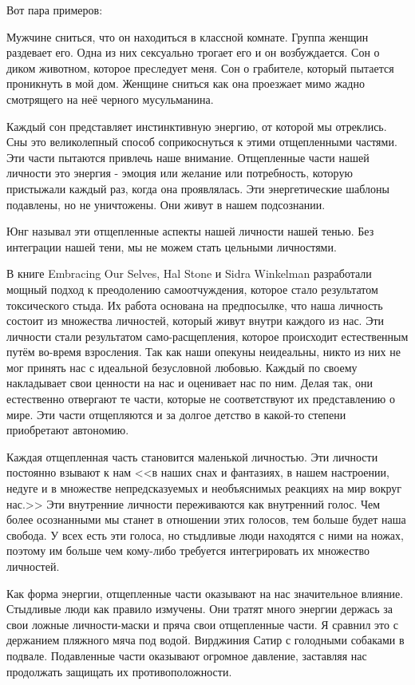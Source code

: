 \documentclass[10pt, fleqn]{article}
\begin{document}
Вот пара примеров:

Мужчине сниться, что он находиться в классной комнате. Группа женщин раздевает его. Одна из них сексуально трогает его и он возбуждается.
Сон о диком животном, которое преследует меня.
Сон о грабителе, который пытается проникнуть в мой дом.
Женщине сниться как она проезжает мимо жадно смотрящего на неё черного мусульманина.

Каждый сон представляет инстинктивную энергию, от которой мы отреклись. Сны это великолепный способ соприкоснуться к этими отщепленными частями. Эти части пытаются привлечь наше внимание. Отщепленные части нашей личности это энергия - эмоция или желание или потребность, которую пристыжали каждый раз, когда она проявлялась. Эти энергетические шаблоны подавлены, но не уничтожены. Они живут в нашем подсознании.

Юнг называл эти отщепленные аспекты нашей личности нашей тенью. Без интеграции нашей тени, мы не можем стать цельными личностями.



В книге Embracing Our Selves, Hal Stone и Sidra Winkelman разработали мощный подход к преодолению самоотчуждения, которое стало результатом токсического стыда. Их работа основана на предпосылке, что наша личность состоит из множества личностей, который живут внутри каждого из нас. Эти личности стали результатом само-расщепления, которое происходит естественным путём во-время взросления. Так как наши опекуны неидеальны, никто из них не мог принять нас с идеальной безусловной любовью. Каждый по своему накладывает свои ценности на нас и оценивает нас по ним. Делая так, они естественно отвергают те части, которые не соответствуют их представлению о мире. Эти части отщепляются и за долгое детство в какой-то степени приобретают автономию.

Каждая отщепленная часть становится маленькой личностью. Эти личности постоянно взывают к нам <<в наших снах и фантазиях, в нашем настроении, недуге и в множестве непредсказуемых и необъяснимых реакциях на мир вокруг нас.>> Эти внутренние личности переживаются как внутренний голос. Чем более осознанными мы станет в отношении этих голосов, тем больше будет наша свобода. У всех есть эти голоса, но стыдливые люди находятся с ними на ножах, поэтому им больше чем кому-либо требуется интегрировать их множество личностей.

Как форма энергии, отщепленные части оказывают на нас значительное влияние. Стыдливые люди как правило измучены. Они тратят много энергии держась за свои ложные личности-маски и пряча свои отщепленные части. Я сравнил это с держанием пляжного мяча под водой. Вирджиния Сатир с голодными собаками в подвале. Подавленные части оказывают огромное давление, заставляя нас продолжать защищать их противоположности.
\end{document}
